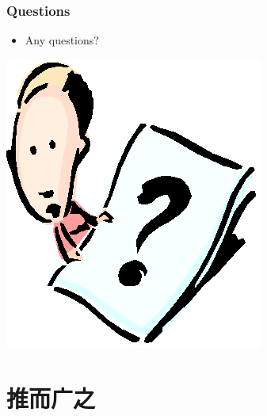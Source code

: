 \documentclass[CJKutf8,xcolor=pdftex,dvipsnames,table]{beamer}
\begin{document}
\begin{CJK*}{UTF8}{song}
  \begin{frame}
    \frametitle{Questions}
    \begin{itemize}
    \item Any questions?
    \end{itemize}
    \begin{center}
      \includegraphics[scale=.5]{question}
    \end{center}
  \end{frame} 
  
  \section{推而广之}
  

\end{CJK*}
\end{document}

